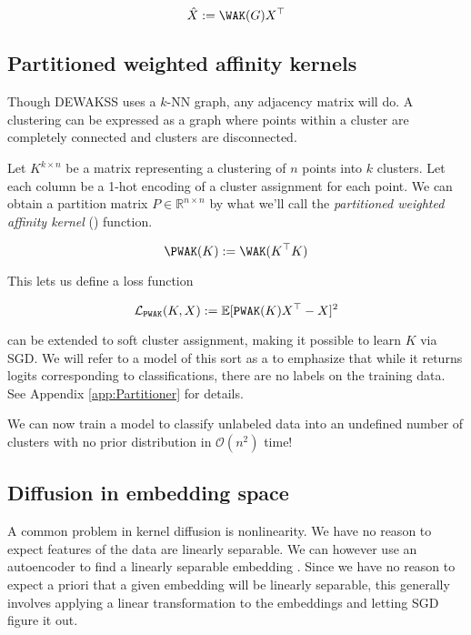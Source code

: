 \begin{equation}
  \label{eq:WAK}
\hat{X} := \WAK(G)X^\top
\end{equation}


\subsection{Partitioned weighted affinity kernels} 

Though DEWAKSS uses a $k$-NN graph, any adjacency matrix will do.
A clustering can be expressed as a graph where points within a cluster are completely connected and clusters are disconnected.

Let $K^{k \times n}$ be a matrix representing a clustering of $n$ points into $k$ clusters. Let each column be a 1-hot encoding of a cluster assignment for each point. We can obtain a partition matrix $P \in \mathbb{R}^{n \times n}$ by what we'll call the \textit{partitioned weighted affinity kernel} (\PWAK) function.

\begin{equation}
  \label{eq:PWAK}
  \PWAK(K) := \WAK(K^\top K)
\end{equation}

This lets us define a loss function

\begin{equation}
  \mathcal{L}_{\mathop{\mathtt{PWAK}}\limits}(K,X) := \mathbb{E}[\mathop{\mathtt{PWAK}}\limits(K)X^\top - X]^2
\end{equation}


\PWAK can be extended to soft cluster assignment, making it possible to learn $K$ via SGD.
We will refer to a model of this sort as a \Partitioner to emphasize that while it returns logits corresponding to classifications, there are no labels on the training data.
See Appendix \ref{app:Partitioner} for details.

We can now train a model to classify unlabeled data into an undefined number of clusters with no prior distribution in $\mathcal{O}(n^2)$ time!


\subsection{Diffusion in embedding space}

A common problem in kernel diffusion is nonlinearity.
We have no reason to expect features of the data are linearly separable.
We can however use an autoencoder to find a linearly separable embedding \cite{xie2016unsupervised}.
Since we have no reason to expect a priori that a given embedding will be linearly separable,
this generally involves applying a linear transformation to the embeddings and letting SGD figure it out.


